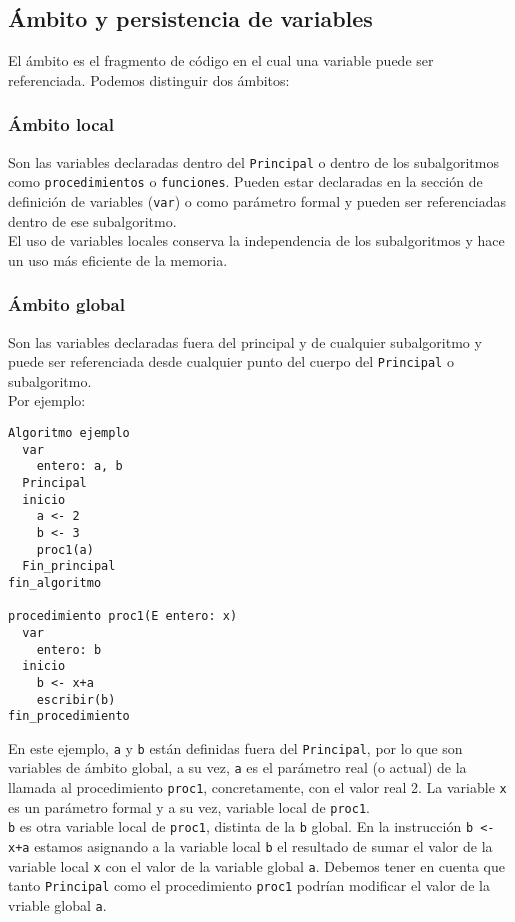 \documentclass[12pt,letterpaper]{article}
\begin{document}
\subsection{Ámbito y persistencia de variables}

El ámbito es el fragmento de código en el cual una variable puede ser referenciada. Podemos distinguir dos ámbitos:

\subsubsection{Ámbito local}

Son las variables declaradas dentro del \texttt{Principal} o dentro de los subalgoritmos como \texttt{procedimientos} o \texttt{funciones}. Pueden estar declaradas en la sección de definición de variables (\texttt{var}) o como parámetro formal y pueden ser referenciadas dentro de ese subalgoritmo.\\
El uso de variables locales conserva la independencia de los subalgoritmos y hace un uso más eficiente de la memoria.

\subsubsection{Ámbito global}

Son las variables declaradas fuera del principal y de cualquier subalgoritmo y puede ser referenciada desde cualquier punto del cuerpo del \texttt{Principal} o subalgoritmo.\\
Por ejemplo:
\begin{lstlisting}
Algoritmo ejemplo
  var
    entero: a, b
  Principal
  inicio
    a <- 2
    b <- 3
    proc1(a)
  Fin_principal
fin_algoritmo
	
procedimiento proc1(E entero: x)
  var
    entero: b
  inicio
    b <- x+a
    escribir(b)
fin_procedimiento
\end{lstlisting}
En este ejemplo, \texttt{a} y \texttt{b} están definidas fuera del \texttt{Principal}, por lo que son variables de ámbito global, a su vez, \texttt{a} es el parámetro real (o actual) de la llamada al procedimiento \texttt{proc1}, concretamente, con el valor real 2. La variable \texttt{x} es un parámetro formal y a su vez, variable local de \texttt{proc1}.\\
\texttt{b} es otra variable local de \texttt{proc1}, distinta de la \texttt{b} global. En la instrucción \texttt{b <- x+a} estamos asignando a la variable local \texttt{b} el resultado de sumar el valor de la variable local \texttt{x} con el valor de la variable global \texttt{a}. Debemos tener en cuenta que tanto \texttt{Principal} como el procedimiento \texttt{proc1} podrían modificar el valor de la vriable global \texttt{a}.
\end{document}
